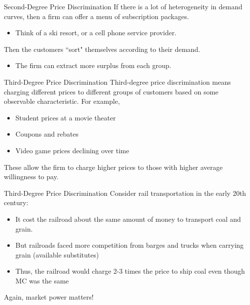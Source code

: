 \documentclass[11pt,t]{beamer}
\begin{document}
\begin{frame}{Second-Degree Price Discrimination}
  If there is a lot of heterogeneity in demand curves, then a firm can offer a menu of subscription packages.

  \begin{itemize}
    \item Think of a ski resort, or a cell phone service provider.
  \end{itemize}

  \bigskip
  Then the customers ``sort" themselves according to their demand.

  \begin{itemize}
    \item The firm can extract more surplus from each group.
  \end{itemize}
\end{frame}

\begin{frame}{Third-Degree Price Discrimination}
  Third-degree price discrimination means charging different prices to different groups of customers based on some observable characteristic. For example,
  \begin{itemize}
    \item Student prices at a movie theater
    \item Coupons and rebates
    \item Video game prices declining over time
  \end{itemize}

  \bigskip
  These allow the firm to charge higher prices to those with higher average willingness to pay.
\end{frame}

\begin{frame}{Third-Degree Price Discrimination}
  Consider rail transportation in the early 20th century:

  \begin{itemize}
    \item It cost the railroad about the same amount of money to transport coal and grain.
    
    \item But railroads faced more competition from barges and trucks when carrying grain (available substitutes)
    
    \item Thus, the railroad would charge 2-3 times the price to ship coal even though MC was the same
  \end{itemize}

  \bigskip Again, market power matters!
\end{frame}
 
\end{document}

